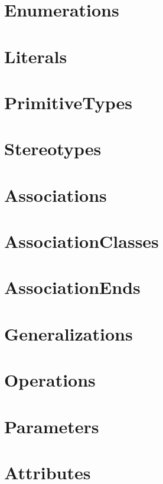 \documentclass[a4paper,DIV=10]{scrartcl}
\begin{document}
\newpage
\section{Enumerations}


\newpage
\section{Literals}


\newpage
\section{PrimitiveTypes}


\newpage
\section{Stereotypes}


\newpage
\section{Associations}


\newpage
\section{AssociationClasses}


\newpage
\section{AssociationEnds}


\newpage
\section{Generalizations}


\newpage
\section{Operations}


\newpage
\section{Parameters}


\newpage
\section{Attributes}

\end{document}
